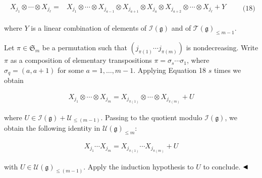 \documentclass[10pt,a4paper]{article}
\begin{document}
\[\begin{aligned}
\begin{split}X_{j_{1}}\otimes\cdots\otimes X_{j_{\ell}}=&X_{j_{1}}\otimes\cdots\otimes X_{j_{a-1}}\otimes X_{j_{a+1}}\otimes X_{j_{a}}\otimes X_{j_{a+2}}\otimes\cdots\otimes X_{j_{\ell}}+Y\end{split}\qquad\text{(18)}
\end{aligned}\]


where $Y$ is a linear combination of elements of $\mathcal{I}(\mathfrak{g})$ and of $\mathcal{T}(\mathfrak{g})_{\leq m-1}$.





Let $\pi\in\mathfrak{S}_{m}$ be a permutation such that $(j_{\pi(1)}\cdots j_{\pi(m)})$ is nondecreasing. Write $\pi$ as a composition of elementary transpositions $\pi=\sigma_{s}\cdots\sigma_{1}$, where $\sigma_{q}=(a,a+1)$ for some $a=1,\ldots,m-1$. Applying Equation 18 $s$ times we obtain



\[\begin{aligned}
X_{j_{1}}\otimes\cdots\otimes X_{j_{m}}=X_{j_{\pi(1)}}\otimes\cdots\otimes X_{j_{\pi(m)}}+U
\end{aligned}\]


where $U\in\mathcal{I}(\mathfrak{g})+\mathcal{U}_{\leq(m-1)}$. Passing to the quotient modulo $\mathcal{I}(\mathfrak{g})$, we obtain the following identity in $\mathcal{U}(\mathfrak{g})_{\leq m}$:



\[\begin{aligned}
X_{j_{1}}\cdots X_{j_{m}}=X_{j_{\pi(1)}}\cdots X_{j_{\pi(m)}}+U
\end{aligned}\]


with $U\in\mathcal{U}(\mathfrak{g})_{\leq(m-1)}$. Apply the induction hypothesis to $U$ to conclude.
$\hfill\blacktriangleleft$
\end{document}
